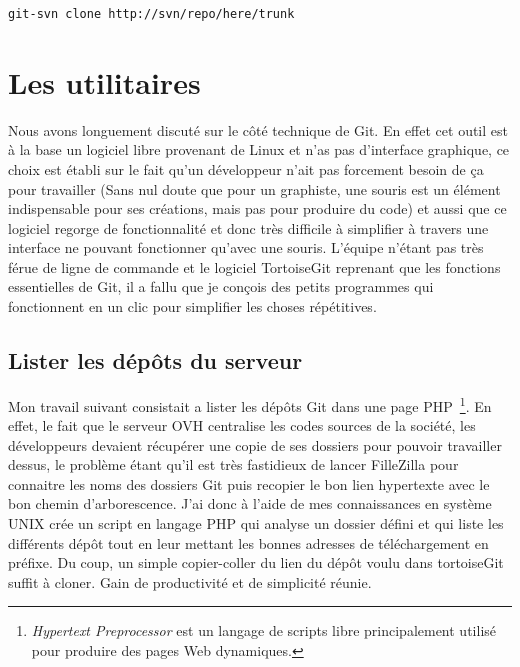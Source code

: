 \begin{lstlisting}
git-svn clone http://svn/repo/here/trunk
\end{lstlisting}

\section{Les utilitaires} %

Nous avons longuement discuté sur le côté technique de Git. En effet cet outil
est à la base un logiciel libre provenant de Linux et n'as pas d'interface
graphique, ce choix est établi sur le fait qu'un développeur n'ait pas
forcement besoin de ça pour travailler (Sans nul doute que pour un graphiste,
une souris est un élément indispensable pour ses créations, mais pas pour
produire du code) et aussi que ce logiciel regorge de fonctionnalité et donc
très difficile à simplifier à travers une interface ne pouvant fonctionner
qu'avec une souris. L'équipe n'étant pas très férue de ligne de commande et le
logiciel TortoiseGit reprenant que les fonctions essentielles de Git, il a
fallu que je conçois des petits programmes qui fonctionnent en un clic pour
simplifier les choses répétitives.


\subsection{Lister les dépôts du serveur}

Mon travail suivant consistait a lister les dépôts Git dans une page PHP\,
\footnote{\emph{Hypertext Preprocessor} est un langage de scripts libre
principalement utilisé pour produire des pages Web dynamiques.}. En effet, le
fait que le serveur OVH centralise les codes sources de la société, les
développeurs devaient récupérer une copie de ses dossiers pour pouvoir
travailler dessus, le problème étant qu'il est très fastidieux de lancer
FilleZilla pour connaitre les noms des dossiers Git puis recopier le bon lien
hypertexte avec le bon chemin d'arborescence. J'ai donc à l'aide de mes
connaissances en système UNIX crée un script en langage PHP qui analyse un
dossier défini et qui liste les différents dépôt tout en leur mettant les
bonnes adresses de téléchargement en préfixe. Du coup, un simple copier-coller
du lien du dépôt voulu dans tortoiseGit suffit à cloner. Gain de productivité
et de simplicité réunie.

